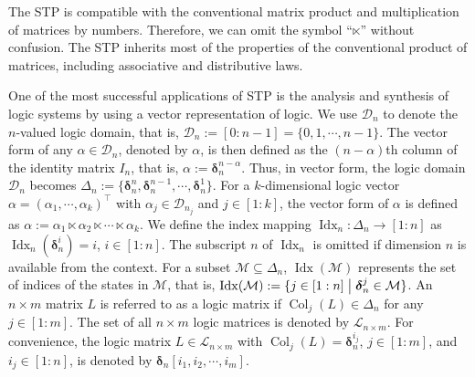 \documentclass[11pt,onecolumn]{article}
\DeclareMathOperator{\col}{Col}
\DeclareMathOperator{\idx}{Idx}
\newtheorem{proposition}{Proposition}
\newcommand{\ddelta}{{\boldsymbol\delta}}
\begin{document}
   The STP is compatible with the conventional matrix product and multiplication of matrices by numbers. Therefore, we can omit the symbol ``$\ltimes$'' without confusion. The STP inherits most of the properties of the conventional product of matrices, including associative and distributive laws.





One of the most successful applications of STP is the analysis and synthesis of logic systems by using a vector representation of logic. We use $\mathscr D_n$ to denote the $n$-valued logic domain, that is,
$\mathscr D_n:=[0:n-1]=\{0,1,\cdots, n-1\}$.
The vector form of any $\alpha\in\mathscr D_n$, denoted by $ \alpha$, is then defined as the $(n-\alpha)$th column of the identity matrix $I_n$, that is,
	$ \alpha:=\ddelta_n^{n-\alpha}$.
Thus, in vector form, the logic domain $\mathscr D_n$ becomes
$\Delta_n:=\{\ddelta_n^n,\ddelta_n^{n-1},\cdots, \ddelta_n^1\}$. For a $k$-dimensional logic vector
	$\alpha=(\alpha_1,\cdots,\alpha_k)^\top$ with $\alpha_j\in\mathscr D_{n_j}$ and $ j\in[1:k]$, the vector form of $\alpha$ is defined as
$ \alpha:= \alpha_1\ltimes  \alpha_2\ltimes\cdots\ltimes  \alpha_k$.
	We define the index mapping $\idx_n: \Delta_n\rightarrow[1:n]$ as $\idx_n(\ddelta_n^i)=i$, $i\in[1:n]$. The subscript $n$ of $\idx_n$ is omitted if dimension $n$ is available from the context.
For a subset $\mathcal M\subseteq\Delta_n$, $\idx(\mathcal M)$ represents the set of indices of the states in $\mathcal M$, that is, $\idx(\mathcal M):=\{j\in[1:n]\bigm| \ddelta_n^j\in\mathcal M\}$.
An $n\times m$ matrix $L$ is referred to as a logic matrix if $\col_j(L)\in\Delta_n$ for any $j\in[1:m]$.
 The set of all $n\times m$ logic matrices is denoted by $\mathscr L_{n\times m}$. For convenience, the logic matrix $L\in\mathscr L_{n\times m}$ with $\col_j(L)=\ddelta_n^{i_j}$, $j\in[1:m]$, and $i_j\in[1:n]$, is denoted by $\ddelta_n[i_1,i_2,\cdots, i_m]$.
	
%
%
%
%
\end{document}
